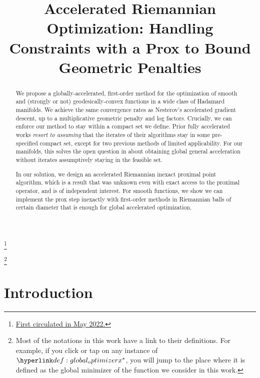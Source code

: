 \documentclass[12pt]{alt2021}
\title[Accelerated Riemannian Optimization: Handle Constraints \& Bound Geometric Penalties]{Accelerated Riemannian Optimization: Handling Constraints with a Prox to Bound Geometric Penalties}
\newcommand\blfootnote[1]{%
  \begingroup
  \renewcommand\thefootnote{}\footnote{#1}%
  \addtocounter{footnote}{-1}%
  \endgroup
}
\begin{document}
\maketitle

\blfootnote{\href{https://openreview.net/forum?id=UPZCt9perOn}{\normalcolor First circulated in May 2022.}}
\blfootnote{Most of the notations in this work have a link to their definitions. For example, if you click or tap on any instance of $\xastg$, you will jump to the place where it is defined as the global minimizer of the function we consider in this work.}

\begin{abstract}
    We propose a globally-accelerated, first-order method for the optimization of smooth and (strongly or not) geodesically-convex functions in a wide class of Hadamard manifolds. We achieve the same convergence rates as Nesterov's accelerated gradient descent, up to a multiplicative geometric penalty and log factors.  
    Crucially, we can enforce our method to stay within a compact set we define. Prior fully accelerated works \textit{resort to assuming} that the iterates of their algorithms stay in some pre-specified compact set, except for two previous methods of limited applicability. For our manifolds, this solves the open question in \citep{kim2022accelerated} about obtaining global general acceleration without iterates assumptively staying in the feasible set.

In our solution, we design an accelerated Riemannian inexact proximal point algorithm, which is a result that was unknown even with exact access to the proximal operator, and is of independent interest. For smooth functions, we show we can implement the prox step inexactly with first-order methods in Riemannian balls of certain diameter that is enough for global accelerated optimization.
\end{abstract}

\clearpage
\tableofcontents

\section{Introduction}\label{sec:introduction}
\end{document}
